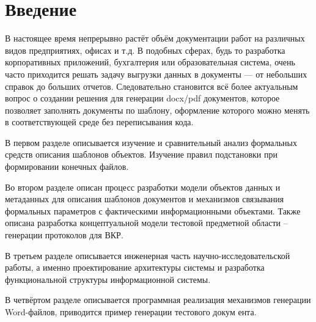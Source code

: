 \chapter*{Введение}
\label{sec:afterwords}

В настоящее время непрерывно растёт объём документации работ на различных видов предприятиях, офисах и т.д. В подобных сферах, будь то разработка корпоративных приложений, бухгалтерия или образовательная система, очень часто приходится решать задачу выгрузки данных в документы — от небольших справок до больших отчетов. Следовательно становится всё более актуальным вопрос о создании решения для генерации docx/pdf документов, которое позволяет заполнять документы по шаблону, оформление которого можно менять в соответствующей среде без переписывания кода.

В первом разделе описывается изучение и сравнительный анализ формальных средств описания шаблонов объектов. Изучение правил подстановки при формировании конечных файлов.         

Во втором разделе описан процесс разработки модели объектов данных и метаданных для описания шаблонов документов и механизмов связывания формальных параметров с фактическими информационными объектами. Также описана разработка концептуальной модели тестовой предметной области – генерации протоколов для ВКР.

    В третьем разделе описывается инженерная часть научно-исследовательской работы, а именно проектирование архитектуры системы и разработка функциональной структуры информационной системы.
    
    В четвёртом разделе описывается программная реализация механизмов генерации Word-файлов, приводится пример генерации тестового докум	ента.



